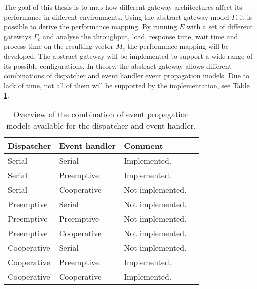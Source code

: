 The goal of this thesis is to map how different gateway architectures affect
its performance in different environments. Using the abstract gateway model
$\Gamma$, it is possible to derive the performance mapping. By running $E$ with
a set of different gateways $\Gamma_c$ and analyse the throughput, load,
response time, wait time and process time on the resulting vector $M_c$ the
performance mapping will be developed. The abstract gateway will be implemented
to support a wide range of its possible configurations. In theory, the abstract
gateway allows different combinations of dispatcher and event handler event
propagation models. Due to lack of time, not all of them will be supported by
the implementation, see Table \ref{tab:event_prop_combinations}.

\begin{table}[h!]

    \caption[Overview of the combination of event propagation models.]{Overview
    of the combination of event propagation models available for the dispatcher
    and event handler.}

    \label{tab:event_prop_combinations}

    \begin{center}
        \begin{tabular}{|l|l|l|l|}
            \hline
            Dispatcher  & Event handler & Comment \\
            \hline
            Serial      & Serial        & Implemented. \\
            Serial      & Preemptive    & Implemented. \\
            Serial      & Cooperative   & Not implemented. \\
            Preemptive  & Serial        & Not implemented. \\
            Preemptive  & Preemptive    & Not implemented. \\
            Preemptive  & Cooperative   & Not implemented. \\
            Cooperative & Serial        & Not implemented. \\
            Cooperative & Preemptive    & Implemented. \\
            Cooperative & Cooperative   & Implemented. \\
            \hline
        \end{tabular}
    \end{center}
\end{table}

